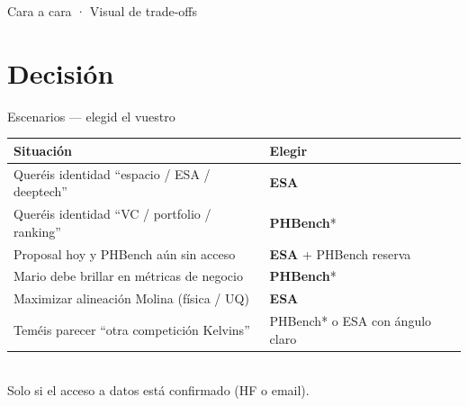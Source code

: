 \documentclass[aspectratio=169,10pt]{beamer}
\begin{document}
\begin{frame}{Cara a cara · Visual de trade-offs}
  \begin{center}
  \end{center}
\end{frame}

\section{Decisión}

\begin{frame}{Escenarios --- elegid el vuestro}
  \tiny
  \renewcommand{\arraystretch}{1.25}
  \begin{tabular}{@{}p{7.2cm}l@{}}
    \toprule
    Situación & Elegir \\
    \midrule
    Queréis identidad ``espacio / ESA / deeptech'' & \textbf{ESA} \\
    Queréis identidad ``VC / portfolio / ranking'' & \textbf{PHBench}* \\
    Proposal hoy y PHBench aún sin acceso & \textbf{ESA} + PHBench reserva \\
    Mario debe brillar en métricas de negocio & \textbf{PHBench}* \\
    Maximizar alineación Molina (física / UQ) & \textbf{ESA} \\
    Teméis parecer ``otra competición Kelvins'' & PHBench* o ESA con ángulo claro \\
    \bottomrule
  \end{tabular}\\[0.4em]
  {\scriptsize *Solo si el acceso a datos está confirmado (HF o email).}
\end{frame}
\end{document}
